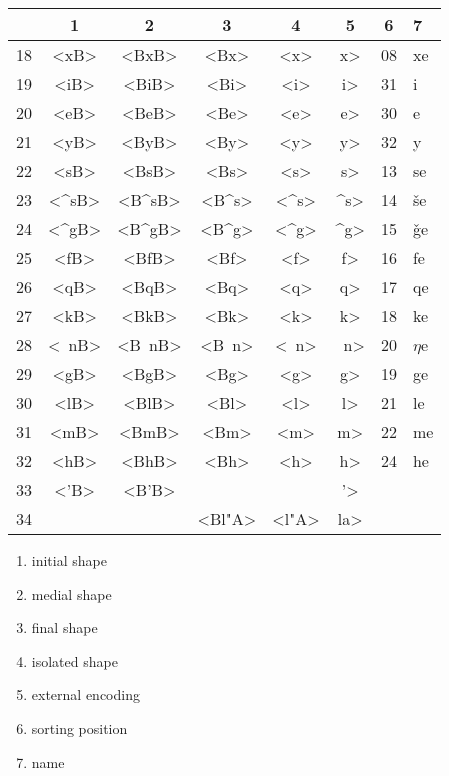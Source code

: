 \documentclass[12pt]{article}
\makeatletter
\def \({\a@verb}
\makeatother
\begin{document}
\parbox[t]{75mm}{%
\null
\begin{tabular}{|r|cccc@{ = }c@{ (}c@{)
 \vrule width0pt height13pt depth10pt}l|}
\hline
  & 1 	& 2 	& 3 	& 4 	& 5 	& 6  & 7 \\
\hline
18&<xB>	&<BxB>	& <Bx>	& <x>	&\(x> 	& 08 & xe \\
19&<iB>	&<BiB>	& <Bi>	& <i>	&\(i> 	& 31 & i \\
20&<eB>	&<BeB>	& <Be>	& <e>	&\(e> 	& 30 & e \\
21&<yB>	&<ByB>	& <By>	& <y>	&\(y> 	& 32 & y \\
22&<sB>	&<BsB>	& <Bs>	& <s>	&\(s> 	& 13 & se \\
23&<^sB>&<B^sB>	& <B^s>	& <^s>	&\(^s> 	& 14 & \v se \\
24&<^gB>&<B^gB>	& <B^g>	& <^g>	&\(^g> 	& 15 & \v ge \\
25&<fB>	&<BfB>	& <Bf>	& <f>	&\(f> 	& 16 & fe \\
26&<qB>	&<BqB>	& <Bq>	& <q>	&\(q> 	& 17 & qe \\
27&<kB>	&<BkB>	& <Bk>	& <k>	&\(k> 	& 18 & ke \\
28&<~nB>&<B~nB>	& <B~n>	& <~n>	&\(~n>	& 20 & $\eta$e \\
29&<gB>	&<BgB>	& <Bg>	& <g>	&\(g> 	& 19 & ge \\
30&<lB>	&<BlB>	& <Bl>	& <l>	&\(l> 	& 21 & le \\
31&<mB>	&<BmB>	& <Bm>	& <m>	&\(m> 	& 22 & me \\
32&<hB>	&<BhB>	& <Bh>	& <h>	&\(h> 	& 24 & he \\
33&<'B>	&<B'B>	& 	& 	&\('> 	&  & \\
34&	&	& <Bl"A>& <l"A>	&\(la> 	&  & \\
\hline
\end{tabular}}

\begin{enumerate}
\itemsep 0pt
\item initial shape
\item medial shape
\item final shape
\item isolated shape
\item external encoding
\item sorting position
\item name
\end{enumerate}

\end{document}

